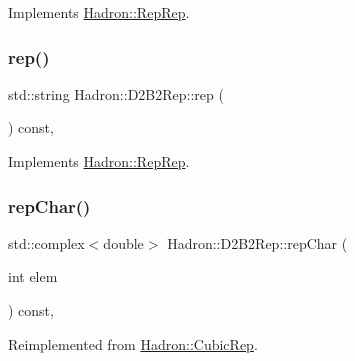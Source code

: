 Implements \mbox{\hyperlink{structHadron_1_1RepRep_ab3213025f6de249f7095892109575fde}{Hadron\+::\+Rep\+Rep}}.

\mbox{\label{structHadron_1_1D2B2Rep_abef26c913db470d0e9a5c6209c79269f}} 
\subsubsection{\texorpdfstring{rep()}{rep()}\hspace{0.1cm}{\footnotesize\ttfamily [3/3]}}
{\footnotesize\ttfamily std\+::string Hadron\+::\+D2\+B2\+Rep\+::rep (\begin{DoxyParamCaption}{ }\end{DoxyParamCaption}) const\hspace{0.3cm}{\ttfamily [inline]}, {\ttfamily [virtual]}}



Implements \mbox{\hyperlink{structHadron_1_1RepRep_ab3213025f6de249f7095892109575fde}{Hadron\+::\+Rep\+Rep}}.

\mbox{\label{structHadron_1_1D2B2Rep_ac6671e025a80770e2dc48904f7e78398}} 
\subsubsection{\texorpdfstring{repChar()}{repChar()}\hspace{0.1cm}{\footnotesize\ttfamily [1/2]}}
{\footnotesize\ttfamily std\+::complex$<$double$>$ Hadron\+::\+D2\+B2\+Rep\+::rep\+Char (\begin{DoxyParamCaption}\item[{int}]{elem }\end{DoxyParamCaption}) const\hspace{0.3cm}{\ttfamily [inline]}, {\ttfamily [virtual]}}



Reimplemented from \mbox{\hyperlink{structHadron_1_1CubicRep_af45227106e8e715e84b0af69cd3b36f8}{Hadron\+::\+Cubic\+Rep}}.

